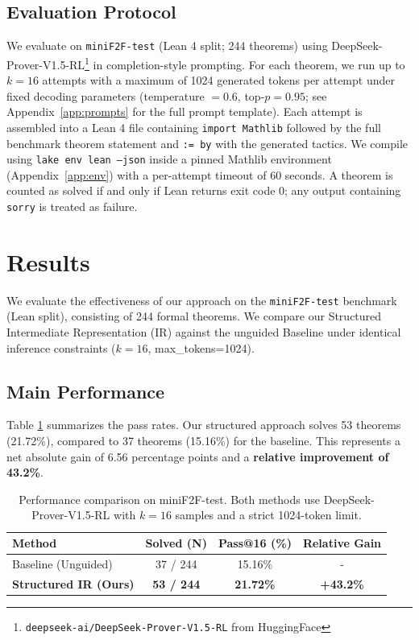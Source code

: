 \documentclass{article}
\begin{document}
\subsection{Evaluation Protocol}
\label{sec:evaluation}
We evaluate on \texttt{miniF2F-test} (Lean 4 split; 244 theorems) using DeepSeek-Prover-V1.5-RL\footnote{\texttt{deepseek-ai/DeepSeek-Prover-V1.5-RL} from HuggingFace} in completion-style prompting. For each theorem, we run up to $k=16$ attempts with a maximum of 1024 generated tokens per attempt under fixed decoding parameters (temperature $= 0.6$, top-$p = 0.95$; see Appendix~\ref{app:prompts} for the full prompt template). Each attempt is assembled into a Lean 4 file containing \texttt{import Mathlib} followed by the full benchmark theorem statement and \texttt{:= by} with the generated tactics. We compile using \texttt{lake env lean --json} inside a pinned Mathlib environment (Appendix~\ref{app:env}) with a per-attempt timeout of 60 seconds. A theorem is counted as solved if and only if Lean returns exit code 0; any output containing \texttt{sorry} is treated as failure.


\section{Results}

We evaluate the effectiveness of our approach on the \texttt{miniF2F-test} benchmark (Lean split), consisting of 244 formal theorems. We compare our Structured Intermediate Representation (IR) against the unguided Baseline under identical inference constraints ($k=16$, max\_tokens=1024).

\subsection{Main Performance}
Table \ref{tab:main_results} summarizes the pass rates. Our structured approach solves 53 theorems (21.72\%), compared to 37 theorems (15.16\%) for the baseline. This represents a net absolute gain of 6.56 percentage points and a \textbf{relative improvement of 43.2\%}.

\begin{table}[h]
    \centering
    \begin{tabular}{lccc}
        \hline
        \textbf{Method} & \textbf{Solved (N)} & \textbf{Pass@16 (\%)} & \textbf{Relative Gain} \\
        \hline
        Baseline (Unguided) & 37 / 244 & 15.16\% & - \\
        \textbf{Structured IR (Ours)} & \textbf{53 / 244} & \textbf{21.72\%} & \textbf{+43.2\%} \\
        \hline
    \end{tabular}
    \caption{Performance comparison on miniF2F-test. Both methods use DeepSeek-Prover-V1.5-RL with $k=16$ samples and a strict 1024-token limit.}
    \label{tab:main_results}
\end{table}
\end{document}
